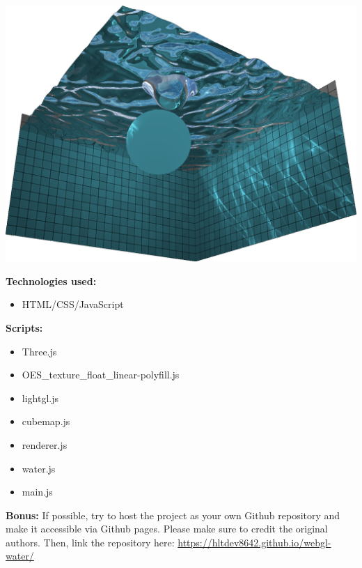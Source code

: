 \documentclass[10pt,oneside,onecolumn,letterpaper]{article}
\begin{document}
\vspace{.5cm}
\noindent\includegraphics[width=\textwidth]{gfx/screenshot-madebyevan_webgl_water.png}

\vspace{1.0cm}

\noindent\textbf{Technologies used:}

\begin{itemize}
    \item HTML/CSS/JavaScript
\end{itemize}

\noindent\textbf{Scripts:}
\begin{itemize}

    \item Three.js
    \item OES\_texture\_float\_linear-polyfill.js
    \item lightgl.js
    \item cubemap.js
    \item renderer.js
    \item water.js
    \item main.js
\end{itemize}

\vspace{.5cm}


\noindent\textbf{Bonus:} If possible, try to host the project as your own Github repository and make it accessible via Github pages. Please make sure to credit the original authors. Then, link the repository here: \url{https://hltdev8642.github.io/webgl-water/}
\end{document}
